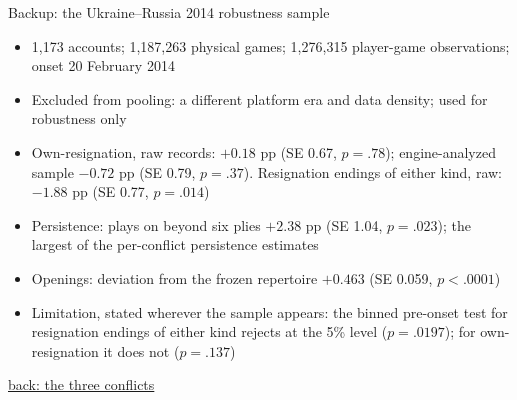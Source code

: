 \documentclass[aspectratio=169,11pt,t]{beamer}
\newcommand{\backto}[2]{\vfill\hfill\hyperlink{#1}{\textcolor{linkblue}{\scriptsize\textsf{back: #2}}}}
\begin{document}
\begin{frame}[label=bk-2014]{Backup: the Ukraine--Russia 2014 robustness sample}
  \small
  \begin{itemize}
    \item 1,173 accounts; 1,187,263 physical games; 1,276,315 player-game observations; onset 20 February 2014
    \item Excluded from pooling: a different platform era and data density; used for robustness only
    \item Own-resignation, raw records: $+0.18$ pp (SE 0.67, $p = .78$); engine-analyzed sample $-0.72$ pp (SE 0.79, $p = .37$). Resignation endings of either kind, raw: $-1.88$ pp (SE 0.77, $p = .014$)
    \item Persistence: plays on beyond six plies $+2.38$ pp (SE 1.04, $p = .023$); the largest of the per-conflict persistence estimates
    \item Openings: deviation from the frozen repertoire $+0.463$ (SE 0.059, $p < .0001$)
    \item Limitation, stated wherever the sample appears: the binned pre-onset test for resignation endings of either kind rejects at the 5\% level ($p = .0197$); for own-resignation it does not ($p = .137$)
  \end{itemize}
  \backto{bk-table1-main}{the three conflicts}
\end{frame}

\end{document}
